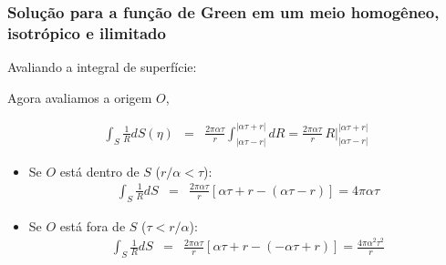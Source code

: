 \documentclass[xcolor=table]{beamer}
\begin{document}
\begin{frame}
\frametitle{\textbf{Solu\c{c}\~ao para a fun\c{c}\~ao de Green em um meio homog\^eneo, isotr\'opico e ilimitado}}
\begin{flushleft}
   \textcolor{red!60!black}{Avaliando a integral de superf\'icie:}
\end{flushleft}

\begin{flushleft}
Agora avaliamos a origem $O$, 
\end{flushleft}
\begin{eqnarray}
  \label{ten1}
   \int_{S} \frac{1}{R} dS(\eta)  &=& \frac{2\pi \alpha \tau}{r} \int_{\left| \alpha\tau -r \right|}^{\left| \alpha\tau +r \right|}  dR  = \frac{2\pi \alpha \tau}{r}\, R \Big|_{\left| \alpha\tau -r \right|}^{\left| \alpha\tau +r \right|} \, 
\end{eqnarray}

\begin{itemize}
 \item Se $O$ est\'a dentro de $S$ ($ r/\alpha < \tau $):
 \begin{eqnarray}
  \label{ten1}
   \int_{S} \frac{1}{R} dS &=& \frac{2\pi \alpha \tau}{r}\left[\alpha \tau +r - (\alpha \tau -r )  \right] = 4\pi \alpha \tau
\end{eqnarray}
 \item Se $O$ est\'a fora de $S$ ($  \tau < r/\alpha $):
  \begin{eqnarray}
  \label{ten1}
    \int_{S} \frac{1}{R} dS &=& \frac{2\pi \alpha \tau}{r}\left[\alpha \tau +r - (-\alpha \tau + r )  \right] = \frac{4\pi \alpha^2 \tau^2}{r} 
\end{eqnarray}
\end{itemize}

\end{frame}%
\end{document}
